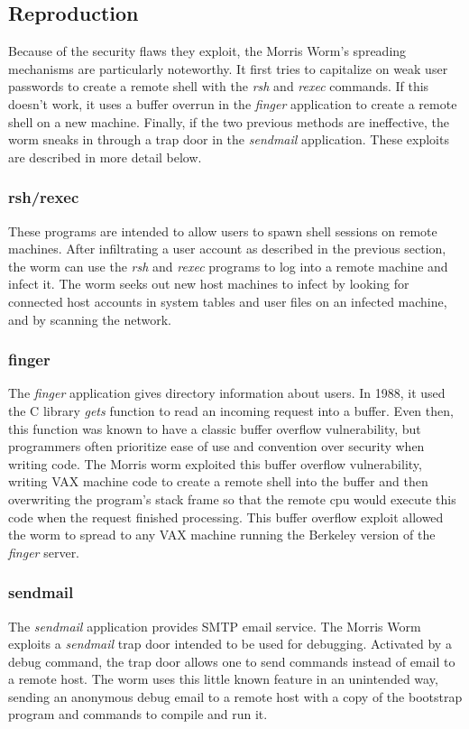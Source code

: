 \subsection*{Reproduction}
Because of the security flaws they exploit, the Morris Worm's spreading
mechanisms are particularly noteworthy. It first tries to capitalize on weak
user passwords to create a remote shell with the \textit{rsh} and \textit{rexec}
commands.
If this doesn't work, it uses a buffer overrun in the \textit{finger}
application to create a remote shell on a new machine. Finally, if the two
previous methods are ineffective, the worm sneaks in through a trap door in the
\textit{sendmail} application. These exploits are described in more detail
below.
\subsubsection*{rsh/rexec}
These programs are intended to allow users to spawn shell sessions on remote
machines. After infiltrating a user account as described in the previous
section, the worm can use the \textit{rsh} and \textit{rexec} programs to log
into a remote machine and infect it. The worm seeks out new host machines to
infect by looking for connected host accounts in
system tables and user files on an infected machine, and by scanning the
network.

\subsubsection*{finger}
The \textit{finger} application gives directory information about users. In 1988,
it used the C library \textit{gets} function to read an incoming request into a buffer.
Even then, this function was known to have a classic buffer overflow
vulnerability, but programmers often prioritize ease of use and convention over security when
writing code. The Morris worm exploited this buffer overflow vulnerability,
writing VAX machine code to create a remote shell into the buffer and then
overwriting the program's stack frame so that the remote cpu would execute
this code when the request finished processing. This buffer overflow exploit
allowed the worm to spread to any VAX machine running the Berkeley version of
the \textit{finger} server.

\subsubsection*{sendmail}
The \textit{sendmail} application provides SMTP email service. The Morris Worm
exploits a \textit{sendmail} trap door intended to be used for debugging.
Activated by a debug command, the trap door allows one to send commands instead of email to a remote host. The
worm uses this little known feature in an unintended way, sending an anonymous
debug email to a remote host with a copy of the bootstrap program and commands
to compile and run it.

